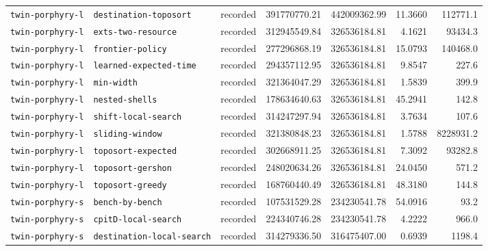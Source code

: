 \begin{longtable}{>{\raggedright\arraybackslash}p{}>{\raggedright\arraybackslash}p{}r r r r r}
\texttt{twin\allowbreak-porphyry\allowbreak-l} & \texttt{destination\allowbreak-toposort} & recorded & 391770770.21 & 442009362.99 & 11.3660 & 112771.1 \\
\texttt{twin\allowbreak-porphyry\allowbreak-l} & \texttt{exts\allowbreak-two\allowbreak-resource} & recorded & 312945549.84 & 326536184.81 & 4.1621 & 93434.3 \\
\texttt{twin\allowbreak-porphyry\allowbreak-l} & \texttt{frontier\allowbreak-policy} & recorded & 277296868.19 & 326536184.81 & 15.0793 & 140468.0 \\
\texttt{twin\allowbreak-porphyry\allowbreak-l} & \texttt{learned\allowbreak-expected\allowbreak-time} & recorded & 294357112.95 & 326536184.81 & 9.8547 & 227.6 \\
\texttt{twin\allowbreak-porphyry\allowbreak-l} & \texttt{min\allowbreak-width} & recorded & 321364047.29 & 326536184.81 & 1.5839 & 399.9 \\
\texttt{twin\allowbreak-porphyry\allowbreak-l} & \texttt{nested\allowbreak-shells} & recorded & 178634640.63 & 326536184.81 & 45.2941 & 142.8 \\
\texttt{twin\allowbreak-porphyry\allowbreak-l} & \texttt{shift\allowbreak-local\allowbreak-search} & recorded & 314247297.94 & 326536184.81 & 3.7634 & 107.6 \\
\texttt{twin\allowbreak-porphyry\allowbreak-l} & \texttt{sliding\allowbreak-window} & recorded & 321380848.23 & 326536184.81 & 1.5788 & 8228931.2 \\
\texttt{twin\allowbreak-porphyry\allowbreak-l} & \texttt{toposort\allowbreak-expected} & recorded & 302668911.25 & 326536184.81 & 7.3092 & 93282.8 \\
\texttt{twin\allowbreak-porphyry\allowbreak-l} & \texttt{toposort\allowbreak-gershon} & recorded & 248020634.26 & 326536184.81 & 24.0450 & 571.2 \\
\texttt{twin\allowbreak-porphyry\allowbreak-l} & \texttt{toposort\allowbreak-greedy} & recorded & 168760440.49 & 326536184.81 & 48.3180 & 144.8 \\
\texttt{twin\allowbreak-porphyry\allowbreak-s} & \texttt{bench\allowbreak-by\allowbreak-bench} & recorded & 107531529.28 & 234230541.78 & 54.0916 & 93.2 \\
\texttt{twin\allowbreak-porphyry\allowbreak-s} & \texttt{cpitD\allowbreak-local\allowbreak-search} & recorded & 224340746.28 & 234230541.78 & 4.2222 & 966.0 \\
\texttt{twin\allowbreak-porphyry\allowbreak-s} & \texttt{destination\allowbreak-local\allowbreak-search} & recorded & 314279336.50 & 316475407.00 & 0.6939 & 1198.4 \\

\end{longtable}
